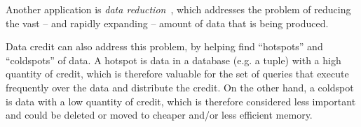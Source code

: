 Another application is \emph{data reduction}~\cite{milo2019getting}, which addresses the problem of reducing the vast -- and rapidly expanding -- amount of data that is being produced. %

Data credit can also address this problem, by helping find ``hotspots'' and ``coldspots'' of data. A hotspot is data in a database (e.g. a tuple) with a high quantity of credit, which is therefore valuable for the set of queries that execute frequently over the data and distribute the credit. 
On the other hand, a coldspot is data with a low quantity of credit, which is therefore  considered less  important and could be deleted or moved to cheaper and/or less efficient memory. 

